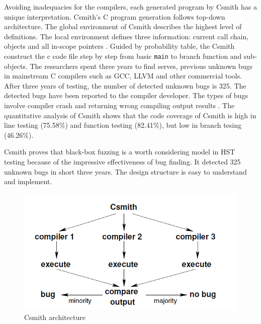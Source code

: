 Avoiding inadequacies for the compilers, each generated program by Csmith has a unique interpretation. Csmith's C program generation follows top-down architecture. The global environment of Csmith describes the highest level of definitions. The local environment defines three information: current call chain, objects and all in-scope pointers \cite{Yang:2011:FUB:1993316.1993532}. Guided by probability table, the Csmith construct the c code file step by step from basic \texttt{main} to branch function and sub-objects. The researchers spent three years to find serves, previous unknown bugs in mainstream C compilers such as GCC, LLVM and other commercial tools. After three years of testing, the number of detected unknown bugs is 325. The detected bugs have been reported to the compiler developer.  The types of bugs involve compiler crash and returning wrong compiling output results \cite{klees2018evaluating}. The quantitative analysis of Csmith shows that the code coverage of Csmith is high in line testing (75.58\%) and function testing (82.41\%), but low in branch tesing (46.26\%).

Csmith proves that black-box fuzzing is a worth considering model in HST testing because of the impressive effectiveness of bug finding. It detected 325 unknown bugs in short three years. The design structure is easy to understand and implement.

\begin{figure}[htbp]
\centering
\includegraphics[scale=0.6]{MScThesisTemplate/Figs/Csmith.PNG}
\caption{\footnotesize Csmith architecture \cite{Yang:2011:FUB:1993316.1993532}}
\label{Fig:csmith}
\end{figure}

